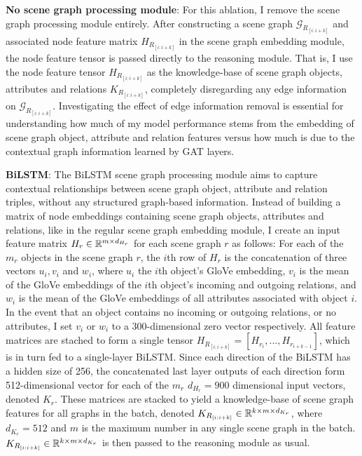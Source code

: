 \textbf{No scene graph processing module}: For this ablation, I remove the scene graph processing module entirely. After constructing a scene graph \(\mathcal{G}_{R_{[i:i+k]}}\) and associated node feature matrix \(H_{R_{[i:i+k]}}\) in the scene graph embedding module, the node feature tensor is passed directly to the reasoning module. That is, I use the node feature tensor \(H_{R_{[i:i+k]}}\) as the knowledge-base of scene graph objects, attributes and relations \(K_{R_{[i:i+k]}}\), completely disregarding any edge information on \(\mathcal{G}_{R_{[i:i+k]}}\). Investigating the effect of edge information removal is essential for understanding how much of my model performance stems from the embedding of scene graph object, attribute and relation features versus how much is due to the contextual graph information learned by GAT layers.

\textbf{BiLSTM}: The BiLSTM scene graph processing module aims to capture contextual relationships between scene graph object, attribute and relation triples, without any structured graph-based information. Instead of building a matrix of node embeddings containing scene graph objects, attributes and relations, like in the regular scene graph embedding module, I create an input feature matrix \(H_r \in \mathbb{R}^{m \times d_{H_r}}\) for each scene graph \(r\) as follows: For each of the \(m_r\) objects in the scene graph \(r\), the \(i\)th row of \(H_r\) is the concatenation of three vectors \(u_i, v_i\) and \(w_i\), where \(u_i\) the \(i\)th object's GloVe embedding, \(v_i\) is the mean of the GloVe embeddings of the \(i\)th object's incoming and outgoing relations, and \(w_i\) is the mean of the GloVe embeddings of all attributes associated with object \(i\). In the event that an object contains no incoming or outgoing relations, or no attributes, I set \(v_i\) or \(w_i\) to a 300-dimensional zero vector respectively. All feature matrices are stached to form a single tensor \(H_{R_{[i:i+k]}} = [H_{r_i}, ..., H_{r_{i+k-1}}]\), which is in turn fed to a single-layer BiLSTM. Since each direction of the BiLSTM has a hidden size of 256, the concatenated last layer outputs of each direction form 512-dimensional vector for each of the \(m_r\) \(d_{H_r} = 900\) dimensional input vectors, denoted \(K_r\). These matrices are stacked to yield a knowledge-base of scene graph features for all graphs in the batch, denoted \(K_{R_{[i:i+k]}} \in \mathbb{R}^{k \times m \times d_{K_r}}\), where \(d_{K_r} = 512\) and \(m\) is the maximum number in any single scene graph in the batch. \(K_{R_{[i:i+k]}} \in \mathbb{R}^{k \times m \times d_{K_r}}\) is then passed to the reasoning module as usual.

